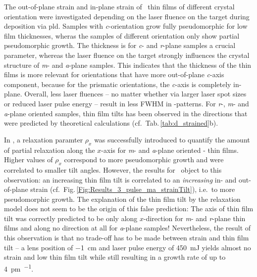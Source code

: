 The out-of-plane strain and in-plane strain of \cro\ thin films of different crystal orientation were investigated depending on the laser fluence on the target during deposition via \gls{pld}.
Samples with \textit{c}-orientation grow fully pseudomorphic for low film thicknesses, wheras the samples of different orientation only show partial pseudomorphic growth.
The thickness is for \textit{c}- and \textit{r}-plane samples a crucial parameter, whereas the laser fluence on the target strongly influences the crystal structure of \textit{m}- and \textit{a}-plane samples.
This indicates that the thickness of the thin films is more relevant for orientations that have more out-of-plane \textit{c}-axis component, because for the prismatic orientations, the \textit{c}-axis is completely in-plane.
Overall, less laser fluences -- no matter whether via larger laser spot sizes or reduced laser pulse energy -- result in less \gls{FWHM} in \textomega-patterns.
For \textit{r}-, \textit{m}- and \textit{a}-plane oriented samples, thin film tilts has been observed in the directions that were predicted by theoretical calculations
    \cite{grundmann2020b,kneiss2021}
(cf.\ Tab.\,\ref{tab:d_strained}b).

In \textcite{kneiss2021}, a relaxation paramter $\rho_x$ was successfully introduced to quantify the amount of partial relaxation along the $x$-axis for \textit{m}- and \textit{a}-plane oriented \textalpha- thin films.
Higher values of $\rho_x$ correspond to more pseudomorphic growth and were correlated to smaller tilt angles.
However, the results for \cro\ object to this observation:
an increasing thin film tilt is correlated to an \emph{increasing} in- and out-of-plane strain (cf.\ Fig.\,\ref{Fig:Results_3_pulse_ma_strainTilt}), i.e.\ to more pseudomorphic growth.
The explanation of the thin film tilt by the relaxation model does not seem to be the origin of this false prediction:
The axis of thin film tilt was correctly predicted to be only along $x$-direction for \textit{m}- and \textit{r}-plane thin films and along no direction at all for \textit{a}-plane samples!
Nevertheless, the result of this observation is that no trade-off has to be made between strain and thin film tilt -- a lens position of \qty{-1}{\cm} and laser pulse energy of \qty{450}{\mJ} yields almost no strain and low thin film tilt while still resulting in a growth rate of up to \qty{4}{\pm\per\pulse}.
